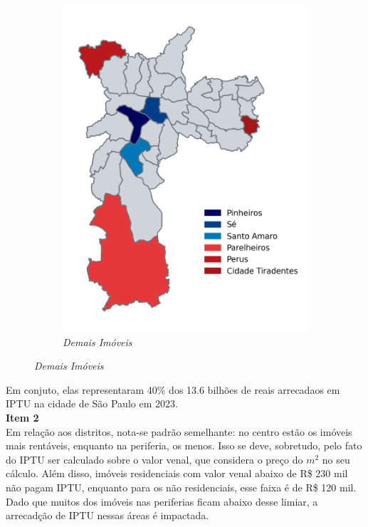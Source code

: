 \documentclass[12pt,a4paper]{article}
\theoremstyle{break}
\begin{document}
\begin{figure}[htbp]
\begin{subfigure}[b]{0.32\textwidth}
    \includegraphics[width=\textwidth]{q1_c.png}
    \caption*{\emph{Demais Imóveis}}
  \end{subfigure}
\end{figure}

\ident Em conjuto, elas representaram 40\% dos 13.6 bilhões de reais arrecadaos em IPTU na cidade de São Paulo em 2023.\\

\textbf{Item 2}\\
\ident Em relação aos distritos, nota-se padrão semelhante: no centro estão os imóveis mais rentáveis, enquanto na periferia, os menos. Isso se deve, sobretudo, pelo fato do IPTU ser calculado sobre o valor venal, que considera o preço do $m^2$ no seu cálculo. Além disso, imóveis residenciais com valor venal abaixo de R\$ 230 mil não pagam IPTU, enquanto para os não residenciais, esse faixa é de R\$ 120 mil. Dado que muitos dos imóveis nas periferias ficam abaixo desse limiar, a arrecadção de IPTU nessas áreas é impactada.\\
\end{document}
